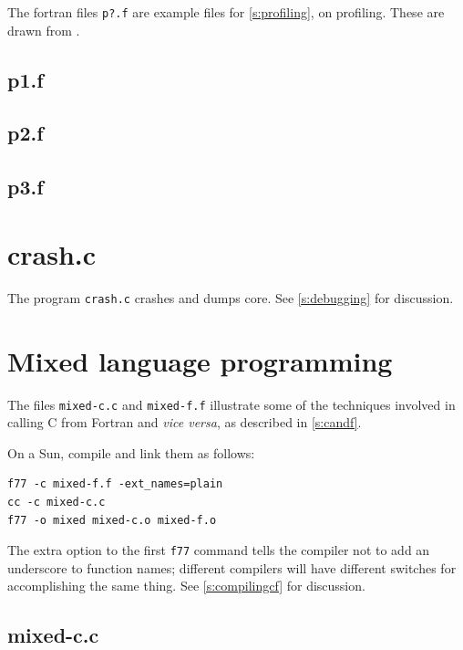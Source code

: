 \documentclass[11pt,oneside,chapters]{starlink}
\begin{document}
The fortran files \texttt{p?.f} are example files for
\ref{s:profiling}, on profiling.  These are drawn
from \citet{sunf77}.

\subsection{p1.f}



\subsection{p2.f}



\subsection{p3.f}



\section{crash.c}
\label{a:crash:c}

The program \texttt{crash.c} crashes and dumps core.
See \ref{s:debugging} for discussion.



\section{Mixed language programming}
\label{a:mixed}

The files \texttt{mixed-c.c} and \texttt{mixed-f.f}
illustrate some of
the techniques involved in calling C from Fortran and
\emph{vice versa}, as described in \ref{s:candf}.

On a Sun, compile and link them as follows:

\begin{verbatim}
f77 -c mixed-f.f -ext_names=plain
cc -c mixed-c.c
f77 -o mixed mixed-c.o mixed-f.o
\end{verbatim}

The extra option to the first \texttt{f77} command
tells the compiler not to add an underscore to function
names; different compilers will have different switches
for accomplishing the same thing.  See \ref{s:compilingcf} for discussion.

\subsection{mixed-c.c}
\end{document}
